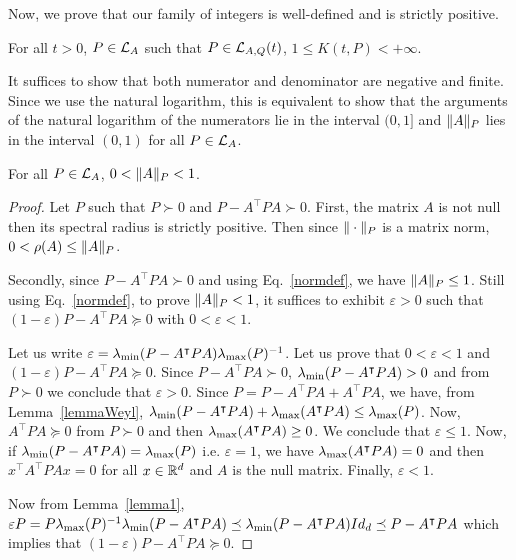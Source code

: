 \documentclass[10pt]{article}
\begin{document}
Now, we prove that our family of integers is well-defined and is strictly positive.

\begin{prop}
For all $t>0$, $P\in \mathcal{L}_{A}$ such that $P\in \mathcal{L}_{A,Q}(t)$, $1\leq K(t,P)< +\infty$.  
\end{prop}

It suffices to show that both numerator and denominator are negative and finite. Since we use the natural logarithm, this is equivalent to show that the arguments of the natural logarithm of the numerators lie in the interval $(0,1]$ and $\| A\|_P$ lies in the interval $(0,1)$ for all $P\in\mathcal{L}_{A}$. 

\begin{lemma}
\label{lyapnorm}
For all $P\in\mathcal{L}_{A}$, $0<\| A\|_P<1$. 
\end{lemma}

\begin{proof}
Let $P$ such that $P\succ 0$ and $P-A^\intercal P A\succ 0$.  First, the matrix $A$ is not null then its spectral radius is strictly positive. Then since $\| \cdot\|_P$ is a matrix norm, $0<\rho(A) \leq \| A\|_P$.

Secondly, since $P-A^\intercal P A\succ 0$ and using Eq.~\eqref{normdef}, we have $\| A\|_P\leq 1$. Still using Eq.~\eqref{normdef}, to prove $\| A\|_P<1$, it suffices to exhibit $\varepsilon>0$ such that $(1-\varepsilon) P-A^\intercal P A\succeq 0$ with $0<\varepsilon<1$. 

Let us write $\varepsilon=\lambda_{\operatorname{min}}(P-A^\intercal P A) \lambda_{\operatorname{max}}(P)^{-1}$. Let us prove that $0<\varepsilon<1$ and $(1-\varepsilon) P-A^\intercal P A\succeq 0$.  Since $P-A^\intercal P A\succ 0$, $\lambda_{\operatorname{min}}(P-A^\intercal P A)>0$ and from $P\succ 0$ we conclude that $\varepsilon >0$. Since $P=P-A^ \intercal P A +A^\intercal P A$, we have, from Lemma~\ref{lemmaWeyl}, $\lambda_{\operatorname{min}}(P-A^\intercal P A)+\lambda_{\operatorname{max}}(A^\intercal P A)\leq \lambda_{\operatorname{max}}(P)$. Now, $A^\intercal P A\succeq 0$ from $P\succ 0$ and then $\lambda_{\operatorname{max}}(A^\intercal P A)\geq 0$. We conclude that $\varepsilon\leq 1$. Now, if $\lambda_{\operatorname{min}}(P-A^\intercal P A)=\lambda_{\operatorname{max}}(P)$ i.e. $\varepsilon=1$, we have 
$\lambda_{\operatorname{max}}(A^\intercal P A)=0$ and then $x^\intercal A^\intercal P A x=0$ for all $x\in \mathbb R^d$ and $A$ is the null matrix. 
Finally, $\varepsilon<1$. 

Now from Lemma~\ref{lemma1}, $\varepsilon P=P\lambda_{\operatorname{max}}(P)^{-1}\lambda_{\operatorname{min}}(P-A^\intercal P A)\preceq \lambda_{\operatorname{min}}(P-A^\intercal P A)Id_d\preceq 
P-A^\intercal P A$ which implies that $(1-\varepsilon) P -A^\intercal P A\succeq 0$. 
\end{proof}
\end{document}
